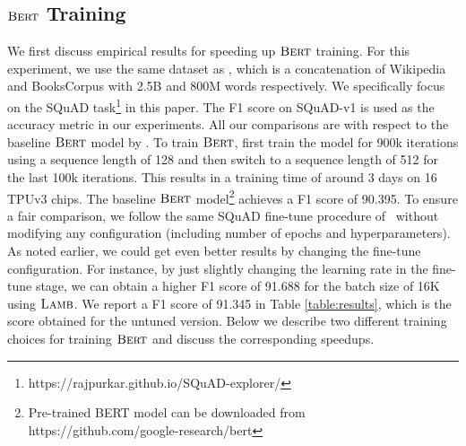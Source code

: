 \subsection{$\textsc{Bert}$ Training}
We first discuss empirical results for speeding up $\textsc{Bert}$ training. For this experiment, we use the same dataset as \cite{devlin2018bert}, which is a concatenation of Wikipedia and BooksCorpus with 2.5B and 800M words respectively. We specifically focus on the SQuAD task\footnote{https://rajpurkar.github.io/SQuAD-explorer/} in this paper. 
The F1 score on SQuAD-v1 is used as the accuracy metric in our experiments. All our comparisons are with respect to the baseline $\textsc{Bert}$ model by \cite{devlin2018bert}. To train $\textsc{Bert}$, \citet{devlin2018bert} first train the model for 900k iterations using a sequence length of 128 and then switch to a sequence length of 512 for the last 100k iterations. This results in a training time of around 3 days on 16 TPUv3 chips. The baseline $\textsc{Bert}$ model\footnote{Pre-trained BERT model can be downloaded  from https://github.com/google-research/bert} achieves a F1 score of 90.395. To ensure a fair comparison, we follow the same SQuAD fine-tune procedure of~\cite{devlin2018bert} without modifying any configuration (including number of epochs and hyperparameters). As noted earlier, we could get even better results by changing the fine-tune configuration. For instance, by just slightly changing the learning rate in the fine-tune stage, we can obtain a higher F1 score of 91.688 for the batch size of 16K using $\textsc{Lamb}$. We report a F1 score of 91.345 in Table \ref{table:results}, which is the score obtained for the untuned version. Below we describe two different training choices for training $\textsc{Bert}$ and discuss the corresponding speedups.

